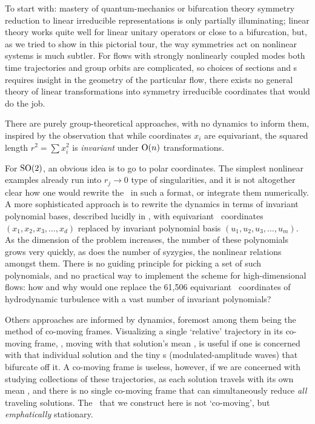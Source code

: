 \documentclass[aip,cha,reprint,
secnumarabic,
nofootinbib, tightenlines,
nobibnotes, showkeys, showpacs,
groupedaddress
]{revtex4-1}
\begin{document}
To start with: mastery of quantum-mechanics or bifurcation
theory symmetry reduction to linear irreducible
representations is only partially illuminating; linear theory
works quite well for linear unitary operators or close to a bifurcation,
but, as we tried to show in this pictorial tour, the way symmetries act
on nonlinear systems is much subtler. For flows with strongly nonlinearly
coupled modes both time trajectories and  group orbits are complicated,
so choices of sections and \slice s requires insight in the geometry of
the particular flow, there exists no general theory of linear
transformations into symmetry irreducible coordinates that would do the
job.

There are purely group-theoretical approaches, with no dynamics to inform
them, inspired by the observation that while coordinates $x_i$ are
equivariant, the squared length $r^2 = \sum x_i^2$ is \emph{invariant}
under $\textrm{O}(n)$ transformations.

For $\textrm{SO}(2)$, an obvious idea is to go to polar coordinates. The
simplest nonlinear examples already run into $r_j \to 0$ type
of singularities, and it is not altogether clear how one would rewrite
the \NSe\ in such a format, or integrate them numerically. A more
sophisticated  approach is to rewrite the dynamics in terms of
invariant polynomial bases, described lucidly in , with
equivariant \statesp\ coordinates $(x_1,x_2,x_3,...,x_d)$ replaced by
invariant polynomial basis $(u_1,u_2,u_3,...,u_m)$. As the dimension of
the problem increases, the number of these polynomials grows very
quickly, as does the number of syzygies, the nonlinear relations amongst
them. There is no guiding principle for picking a set of such
polynomials, and no practical way to implement the
scheme for high-dimensional flows: how and why would one
replace the 61,506 equivariant \statesp\ coordinates of hydrodynamic
turbulence with a vast number of invariant polynomials?

Others approaches are informed by dynamics, foremost among them being the
method of {co-moving frames}. Visualizing a single `relative' trajectory
in its co-moving frame, \ie, moving with that solution's mean
{\phaseVel}, is useful if one is concerned with that individual solution
and the tiny \rpo s (modulated-amplitude waves) that bifurcate off
it. A co-moving frame is useless, however, if
we are concerned with studying collections of these trajectories, as each
solution travels with its own mean {\phaseVel}, and there is no single
co-moving frame that can simultaneously reduce \emph{all} traveling
solutions. The \slice\ that we construct here is not `co-moving', but
\emph{emphatically} stationary.
\end{document}
